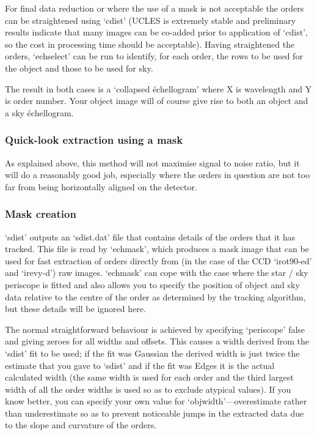 \documentclass[11pt,twoside]{article}
\newcommand{\latorhtm}[2]{#1}
\newcommand{\latorhtm}[2]{#2}
\begin{document}
   For final data reduction or where the use of a mask is not acceptable
   the orders can be straightened using `cdist' (UCLES is extremely
   stable and preliminary results indicate that many images can be
   co-added prior to application of `cdist', so the cost in processing
   time should be acceptable). Having straightened the orders,
   `echselect' can be run to identify, for each order, the rows to be
   used for the object and those to be used for sky.

   The result in both cases is a `collapsed \'echellogram' where X is
   wavelength and Y is order number. Your object image will of course
   give rise to both an object and a sky \'echellogram.


\subsubsection{Quick-look extraction using a mask}

   As explained above, this method will not maximise signal to noise
   ratio, but it will do a reasonably good job, especially where the
   orders in question are not too far from being horizontally aligned on
   the detector.


\subsubsection{Mask creation}

   `sdist' outputs an `sdist.dat' file that contains details of the
   orders that it has tracked. This file is read by `echmask', which
   produces a mask image that can be used for fast extraction of orders
   directly from (in the case of the CCD `irot90-ed' and `irevy-d') raw
   images.  `echmask' can cope with the case where the star / sky
   periscope is fitted and also allows you to specify the position of
   object and sky data relative to the centre of the order as determined
   by the tracking algorithm, but these details will be ignored here.

   The normal straightforward behaviour is achieved by specifying
   `periscope' false and giving zeroes for all widths and offsets. This
   causes a width derived from the `sdist' fit to be used; if the fit
   was Gaussian the derived width is just twice the estimate that you
   gave to `sdist' and if the fit was Edges it is the actual calculated
   width (the same width is used for each order and the third largest
   width of all the order widths is used so as to exclude atypical
   values). If you know better, you can specify your own value for
   `objwidth'\latorhtm{---}{-}overestimate rather than underestimate so as
   to prevent
   noticeable jumps in the extracted data due to the slope and curvature
   of the orders.
\end{document}
